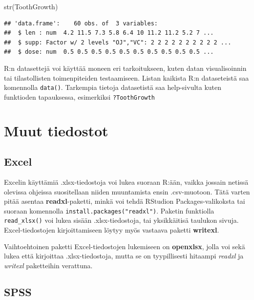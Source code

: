 \documentclass[
]{book}
\newenvironment{Shaded}{\begin{snugshade}}{\end{snugshade}}
\newcommand{\FunctionTok}[1]{\textcolor[rgb]{0.00,0.00,0.00}{#1}}
\newcommand{\NormalTok}[1]{#1}
\begin{document}
\begin{Shaded}
\begin{Highlighting}[]
\FunctionTok{str}\NormalTok{(ToothGrowth)}
\end{Highlighting}
\end{Shaded}

\begin{verbatim}
## 'data.frame':    60 obs. of  3 variables:
##  $ len : num  4.2 11.5 7.3 5.8 6.4 10 11.2 11.2 5.2 7 ...
##  $ supp: Factor w/ 2 levels "OJ","VC": 2 2 2 2 2 2 2 2 2 2 ...
##  $ dose: num  0.5 0.5 0.5 0.5 0.5 0.5 0.5 0.5 0.5 0.5 ...
\end{verbatim}

R:n datasettejä voi käyttää moneen eri tarkoitukseen, kuten datan visualisoinnin tai tilastollisten toimenpiteiden testaamiseen. Listan kaikista R:n dataseteistä saa komennolla \texttt{data()}. Tarkempia tietoja datasetistä saa help-sivulta kuten funktioden tapauksessa, esimerkiksi \texttt{?ToothGrowth}

\hypertarget{muut-tiedostot}{%
\section{Muut tiedostot}\label{muut-tiedostot}}

\hypertarget{excel}{%
\subsection{Excel}\label{excel}}

Excelin käyttämiä .xlsx-tiedostoja voi lukea suoraan R:ään, vaikka jossain netissä olevissa ohjeissa suositellaan niiden muuntamista ensin .csv-muotoon. Tätä varten pitää asentaa \textbf{readxl}-paketti, minkä voi tehdä RStudion Packages-valikoksta tai suoraan komennolla \texttt{install.packages("readxl")}. Paketin funktiolla \texttt{read\_xlsx()} voi lukea sisään .xlsx-tiedostoja, tai yksikkäitisä taulukon sivuja. Excel-tiedostojen kirjoittamiseen löytyy myös vastaava paketti \textbf{writexl}.

Vaihtoehtoinen paketti Excel-tiedostojen lukemiseen on \textbf{openxlsx}, jolla voi sekä lukea että kirjoittaa .xlsx-tiedostoja, mutta se on tyypillisesti hitaampi \emph{readxl} ja \emph{writexl} paketteihin verattuna.

\hypertarget{spss}{%
\subsection{SPSS}\label{spss}}
\end{document}
